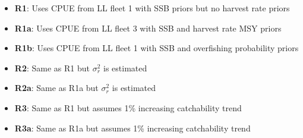 \documentclass[12pt,a4paper,twoside,times,sky,standard]{csiroreport2017}
\newcommand{\sigr}{\sigma^2_r}
\begin{document}
\begin{itemize}
    \item \textbf{R1}: Uses CPUE from LL fleet 1 with SSB priors but no harvest rate priors
    \item \textbf{R1a}: Uses CPUE from LL fleet 3 with SSB and harvest rate MSY priors
    \item \textbf{R1b}: Uses CPUE from LL fleet 1 with SSB and overfishing probability priors
    \item \textbf{R2}: Same as R1 but $\sigr$ is estimated 
    \item \textbf{R2a}: Same as R1a but $\sigr$ is estimated
    \item \textbf{R3}: Same as R1 but assumes 1\% increasing catchability trend
    \item \textbf{R3a}: Same as R1a but assumes 1\% increasing catchability trend
\end{itemize}
\end{document}
